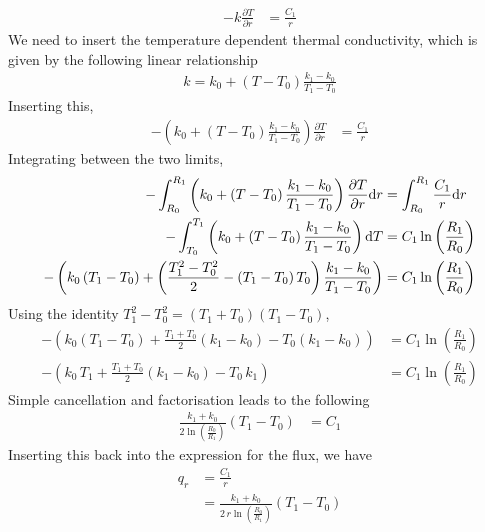 \documentclass[calculator,datasheet,handbook,solutions]{exam}
\begin{document}
\begin{question}
\begin{enumerate}[a)]
{      \begin{align*}
        -k \frac{\partial T}{\partial r} &= \frac{C_1}{r}
      \end{align*}
      We need to insert the temperature dependent thermal
      conductivity, which is given by the following linear relationship
      \begin{align*}
        k = k_{0} + \left(T-T_{0}\right)\frac{k_{1}-k_{0}}{T_{1}-T_{0}}
      \end{align*}
      Inserting this,
      \begin{align*}
        -\left(k_{0} + \left(T-T_{0}\right)\frac{k_{1}-k_{0}}{T_{1}-T_{0}}\right) \frac{\partial T}{\partial r} &= \frac{C_1}{r}
      \end{align*}
      Integrating between the two limits,
      \begin{align*}
        -\int_{R_{0}}^{R_{1}}\left(k_{0} + \left(T-T_{0}\right)\frac{k_{1}-k_{0}}{T_{1}-T_{0}}\right) \frac{\partial T}{\partial r}{\rm d}r&= \int_{R_{0}}^{R_{1}}\frac{C_1}{r}{\rm d}r\\
        -\int_{T_{0}}^{T_{1}}\left(k_{0} + \left(T-T_{0}\right)\frac{k_{1}-k_{0}}{T_{1}-T_{0}}\right){\rm d}T&= C_1\ln\left(\frac{R_{1}}{R_{0}}\right)\\
        -\left(k_{0}\left(T_{1}-T_{0}\right) + \left(\frac{T_{1}^2-T_{0}^2}{2}-\left(T_{1}-T_{0}\right)T_{0}\right)\frac{k_{1}-k_{0}}{T_{1}-T_{0}}\right)&= C_1\ln\left(\frac{R_{1}}{R_{0}}\right)
      \end{align*}
      Using the identity $T_{1}^2-T_{0}^2=(T_{1}+T_{0})(T_{1}-T_{0})$,
      \begin{align*}
        -\left(k_{0}\left(T_{1}-T_{0}\right) + \frac{T_{1}+T_{0}}{2}(k_{1}-k_{0})-T_{0}(k_{1}-k_{0})\right)&= C_1\ln\left(\frac{R_{1}}{R_{0}}\right)\\
        -\left(k_{0}\,T_{1} + \frac{T_{1}+T_{0}}{2}(k_{1}-k_{0})-T_{0}\,k_{1}\right)&= C_1\ln\left(\frac{R_{1}}{R_{0}}\right)
      \end{align*}
      Simple cancellation and factorisation leads to the following
      \begin{align*}
        \frac{k_{1}+k_{0}}{2\ln\left(\frac{R_{0}}{R_{1}}\right)}(T_{1}-T_{0})&= C_1
      \end{align*}
      Inserting this back into the expression for the flux, we have
      \begin{align*}
        q_r &= \frac{C_1}{r}\\
            &= \frac{k_{1}+k_{0}}{2\,r\ln\left(\frac{R_{0}}{R_{1}}\right)}(T_{1}-T_{0})

\end{align*}}
\end{enumerate}
\end{question}
\end{document}

